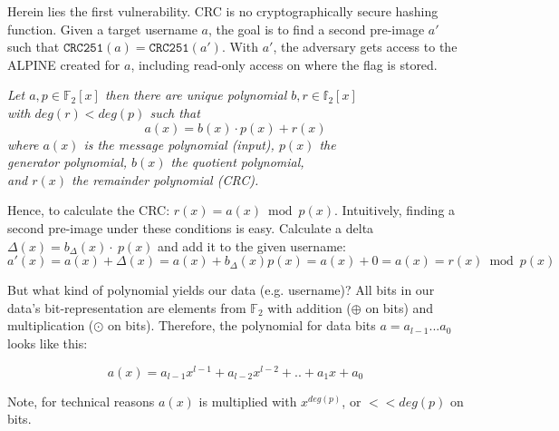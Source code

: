 \documentclass[10pt]{article}
\newcommand{\definition}[2]{
\begin{tcolorbox}[
		title={#1},hbox,
		colframe=green!75!black,
		colback=green!40!white,
		coltitle=black,
	]
    \begin{varwidth}{\textwidth}
		#2
    \end{varwidth}
\end{tcolorbox}
}
\begin{document}
Herein lies the first vulnerability. CRC is no cryptographically secure hashing function. Given a target username $a$, the goal is to find a second pre-image $a'$ such that $\texttt{CRC251}(a) = \texttt{CRC251}(a')$. With $a'$, the adversary gets access to the ALPINE created for $a$, including read-only access on  where the flag is stored. \\

\begin{center}
	\definition{CRC}{
	\textit{Let $a, p \in \mathds{F}_2[x]$ then there are unique polynomial $b, r \in \mathds{f}_2[x]$ \\ with $deg(r) < deg(p)$ such that}
	\begin{equation*}
		a(x) = b(x) \cdot p(x) + r(x)
	\end{equation*}
	\textit{where $a(x)$ is the message polynomial (input), $p(x)$ the \\ generator polynomial, $b(x)$ the quotient polynomial, \\ and $r(x)$ the remainder polynomial (CRC).}
	}
\end{center}

\vspace*{.4cm}
Hence, to calculate the CRC: $r(x) = a(x)\bmod p(x)$. Intuitively, finding a second pre-image under these conditions is easy. Calculate a delta $\Delta(x) = b_\Delta(x) \cdot\ p(x)$ and add it to the given username:
\begin{equation}
	a'(x) = a(x) + \Delta(x) = a(x) + b_\Delta(x)p(x) = a(x) + 0 = a(x) = r(x) \bmod p(x)
\end{equation}

But what kind of polynomial yields our data (e.g. username)? All bits in our data's bit-representation are elements from $\mathds{F}_2$ with addition ($\oplus$ on bits) and multiplication ($\odot$ on bits). Therefore, the polynomial for data bits $a=a_{l-1}...a_0$ looks like this:

\begin{equation}
	a(x) = a_{l-1}x^{l-1}+a_{l-2}x^{l-2}+..+a_1x+a_0
\end{equation}

\vspace*{.4cm}
Note, for technical reasons $a(x)$ is multiplied with $x^{deg(p)}$, or $<< deg(p)$ on bits. \\
\end{document}
